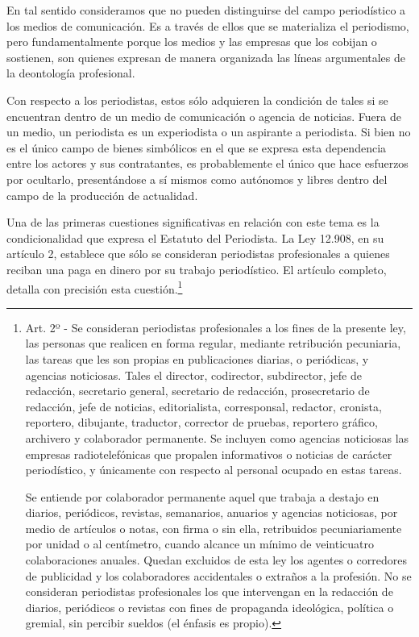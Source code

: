 En tal sentido consideramos que no pueden distinguirse del campo periodístico a los medios de comunicación. Es a través de ellos que se materializa el periodismo, pero fundamentalmente porque los medios y las empresas que los cobijan o sostienen, son quienes expresan de manera organizada las líneas argumentales de la deontología profesional.

Con respecto a los periodistas, estos sólo adquieren la condición de tales si se encuentran dentro de un medio de comunicación o agencia de noticias. Fuera de un medio, un periodista es un experiodista o un aspirante a periodista. Si bien no es el único campo de bienes simbólicos en el que se expresa esta dependencia entre los actores y sus contratantes, es probablemente el único que hace esfuerzos por ocultarlo, presentándose a sí mismos como autónomos y libres dentro del campo de la producción de actualidad.

Una de las primeras cuestiones significativas en relación con este tema es la condicionalidad que expresa el Estatuto del Periodista. La Ley 12.908, en su artículo 2, establece que sólo se consideran periodistas profesionales a quienes reciban una paga en dinero por su trabajo periodístico. El artículo completo, detalla con precisión esta cuestión.\footnote{Art. 2º - Se consideran periodistas profesionales a los fines de la presente ley, las personas que realicen en forma regular, mediante retribución pecuniaria, las tareas que les son propias en publicaciones diarias, o periódicas, y agencias noticiosas. Tales el director, codirector, subdirector, jefe de redacción, secretario general, secretario de redacción, prosecretario de redacción, jefe de noticias, editorialista, corresponsal, redactor, cronista, reportero, dibujante, traductor, corrector de pruebas, reportero gráfico, archivero y colaborador permanente. Se incluyen como agencias noticiosas las empresas radiotelefónicas que propalen informativos o noticias de carácter periodístico, y únicamente con respecto al personal ocupado en estas tareas.

  Se entiende por colaborador permanente aquel que trabaja a destajo en diarios, periódicos, revistas, semanarios, anuarios y agencias noticiosas, por medio de artículos o notas, con firma o sin ella, retribuidos pecuniariamente por unidad o al centímetro, cuando alcance un mínimo de veinticuatro colaboraciones anuales. Quedan excluidos de esta ley los agentes o corredores de publicidad y los colaboradores accidentales o extraños a la profesión. No se consideran periodistas profesionales los que intervengan en la redacción de diarios, periódicos o revistas con fines de propaganda ideológica, política o gremial, sin percibir sueldos (el énfasis es propio).}

